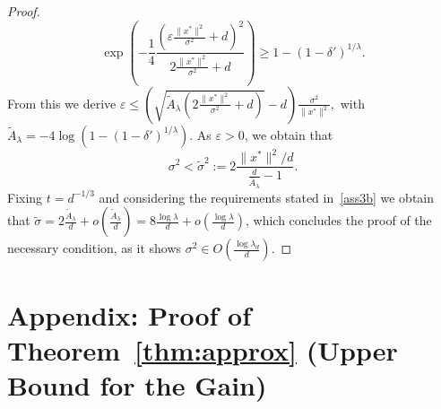 \begin{proof}
$$ \exp{\left(-\frac14 \frac{(\varepsilon\frac{\lVert x^*\rVert^2}{\sigma^2}+d)^2}{2\frac{\lVert x^*\rVert^2}{\sigma^2}+d}\right)}\geq1-(1-\delta')^{1/\lambda}.$$
%
From this we derive
$\varepsilon \leq \left( \sqrt{ \tilde{A}_\lambda\left(2\frac{\lVert x^*\rVert^2}{\sigma^2}+d\right)}-d \right)\frac{\sigma^2}{\lVert x^*\rVert^2},$ 
with $\tilde{A}_\lambda =-4\log\left(1-(1-\delta')^{1/\lambda}\right)$. 
As $\varepsilon>0$, we obtain that 
$$\sigma^2< \tilde{\sigma}^2 := 2\frac{\lVert x^*\rVert^2/d}{\frac{d}{\bar{A}_\lambda}-1}.$$ 
Fixing $t = d^{-1/3}$ and considering the requirements stated in~\eqref{ass3b} we obtain that 
$\tilde{\sigma}= 2\frac{\tilde{A}_\lambda}{d}+o\left(\frac{\tilde{A}_\lambda}{d}\right)=8 \frac{\log \lambda}{d}+o\left(\frac{\log \lambda}{d}\right)$,
which concludes the proof of the necessary condition, as it shows 
$\sigma^2\in O\left( \frac{\log\lambda_d}{d}\right)$.
\end{proof}

\section{Appendix: Proof of Theorem~\ref{thm:approx} (Upper Bound for the Gain)}
\label{sec:approx} 

